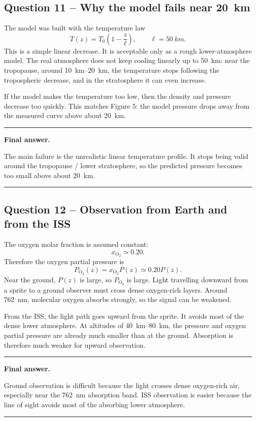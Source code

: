 \documentclass[11pt,a4paper]{article}
\newenvironment{finalanswer}{%
  \begin{center}\begin{minipage}{0.94\linewidth}\hrule\vspace{0.45em}\textbf{Final answer. }%
}{%
  \vspace{0.45em}\hrule\end{minipage}\end{center}%
}
\newcommand{\Otwo}{\ensuremath{\mathrm{O}_2}}
\begin{document}
\subsection*{Question 11 -- Why the model fails near \SI{20}{km}}

The model was built with the temperature law
\[
 T(z)=T_0\left(1-\frac{z}{\ell}\right),\qquad \ell=\SI{50}{km}.
\]
This is a simple linear decrease. It is acceptable only as a rough lower-atmosphere model. The real atmosphere does not keep cooling linearly up to \SI{50}{km}: near the tropopause, around \SIrange{10}{20}{km}, the temperature stops following the tropospheric decrease, and in the stratosphere it can even increase.

If the model makes the temperature too low, then the density and pressure decrease too quickly. This matches Figure 5: the model pressure drops away from the measured curve above about \SI{20}{km}.

\begin{finalanswer}
The main failure is the unrealistic linear temperature profile. It stops being valid around the tropopause / lower stratosphere, so the predicted pressure becomes too small above about \SI{20}{km}.
\end{finalanswer}

\subsection*{Question 12 -- Observation from Earth and from the ISS}

The oxygen molar fraction is assumed constant:
\[
 x_{\Otwo}\simeq 0.20.
\]
Therefore the oxygen partial pressure is
\[
 P_{\Otwo}(z)=x_{\Otwo}P(z)\simeq0.20P(z).
\]
Near the ground, $P(z)$ is large, so $P_{\Otwo}$ is large. Light travelling downward from a sprite to a ground observer must cross dense oxygen-rich layers. Around \SI{762}{nm}, molecular oxygen absorbs strongly, so the signal can be weakened.

From the ISS, the light path goes upward from the sprite. It avoids most of the dense lower atmosphere. At altitudes of \SIrange{40}{80}{km}, the pressure and oxygen partial pressure are already much smaller than at the ground. Absorption is therefore much weaker for upward observation.

\begin{finalanswer}
Ground observation is difficult because the light crosses dense oxygen-rich air, especially near the \SI{762}{nm} absorption band. ISS observation is easier because the line of sight avoids most of the absorbing lower atmosphere.
\end{finalanswer}
\end{document}
